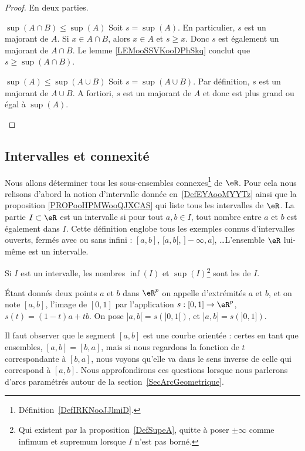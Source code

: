 \begin{proof}
	En deux parties.
	\begin{subproof}
		\item[$ \sup(A\cap B)\leq \sup(A)$ ]
		Soit \( s=\sup(A)\). En particulier, \( s\) est un majorant de \( A\). Si \( x\in A\cap B\), alors \( x\in A\) et \( s\geq x\). Donc \( s\) est également un majorant de \( A\cap B\). Le lemme \ref{LEMooSSVKooDPhSkq} conclut que \( s\geq \sup(A\cap B)\).

		\item[$ \sup(A)\leq \sup(A\cup B)$ ]
		Soit \( s=\sup(A\cup B)\). Par définition, \( s\) est un majorant de \( A\cup B\). A fortiori, \( s\) est un majorant de \( A\) et donc est plus grand ou égal à \( \sup(A)\).
	\end{subproof}
\end{proof}

\subsection{Intervalles et connexité}

Nous allons déterminer tous les sous-ensembles connexes\footnote{Définition~\ref{DefIRKNooJJlmiD}.} de \( \eR\). Pour cela nous relisons d'abord la notion d'intervalle donnée en~\ref{DefEYAooMYYTz} ainsi que la proposition \ref{PROPooHPMWooQJXCAS} qui liste tous les intervalles de \( \eR\). La partie \( I\subset \eR\) est un intervalle si pour tout \( a,b\in I\), tout nombre entre \( a\) et \( b\) est également dans \( I\). Cette définition englobe tous les exemples connus d'intervalles ouverts, fermés avec ou sans infini : \( [a,b]\), \( [a,b[\), \( ]-\infty,a]\), \ldots L'ensemble \( \eR\) lui-même est un intervalle.

Si \( I\) est un intervalle, les nombres \( \inf(I)\) et \( \sup(I)\)\footnote{Qui existent par la proposition~\ref{DefSupeA}, quitte à poser \( \pm\infty\) comme infimum et supremum lorsque \( I\) n'est pas borné.} sont les  de \( I\).

\begin{definition}      \label{DefLISOooDHLQrl}
	Étant donnés deux points \( a\) et \( b\) dans \( \eR^p\) on appelle  d'extrémités \( a\) et \( b\), et on note \( [a,b]\), l'image de \( [0,1]\) par l'application \( s: [0,1]\to \eR^p\), \( s(t)= (1-t)a+tb\).  On pose \( ]a,b[=s\left(]0,1[\right)\), et  \( ]a,b]=s\left(]0,1]\right)\).
\end{definition}
Il faut observer que le segment \( [a,b]\) est une courbe orientée : certes en tant que ensembles, \( [a,b]=[b,a]\), mais si nous regardons la fonction de \( t\) correspondante à \( [b,a]\), nous voyons qu'elle va dans le sens inverse de celle qui correspond à \( [a,b]\). Nous approfondirons ces questions lorsque nous parlerons d'arcs paramétrés autour de la section~\ref{SecArcGeometrique}.

